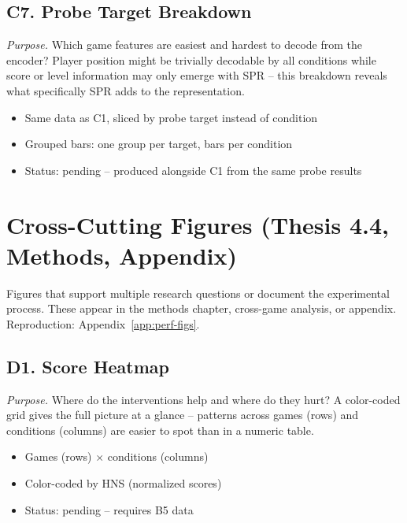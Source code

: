 \documentclass[11pt]{article}
\begin{document}
\vspace{0.5em}

\subsection*{C7. Probe Target Breakdown}

\noindent\textit{Purpose.} Which game features are easiest and
hardest to decode from the encoder? Player position might be
trivially decodable by all conditions while score or level
information may only emerge with SPR -- this breakdown reveals
what specifically SPR adds to the representation.

\begin{itemize}[leftmargin=2em, itemsep=0.1em, topsep=0.3em]
  \item Same data as C1, sliced by probe target instead of
    condition
  \item Grouped bars: one group per target, bars per condition
  \item Status: pending -- produced alongside C1 from the same
    probe results
\end{itemize}


\section{Cross-Cutting Figures (Thesis 4.4, Methods, Appendix)}

\noindent Figures that support multiple research questions or
document the experimental process. These appear in the methods
chapter, cross-game analysis, or appendix.
Reproduction: Appendix~\ref{app:perf-figs}.

\subsection*{D1. Score Heatmap}

\noindent\textit{Purpose.} Where do the interventions help and
where do they hurt? A color-coded grid gives the full picture at
a glance -- patterns across games (rows) and conditions (columns)
are easier to spot than in a numeric table.

\begin{itemize}[leftmargin=2em, itemsep=0.1em, topsep=0.3em]
  \item Games (rows) $\times$ conditions (columns)
  \item Color-coded by HNS (normalized scores)
  \item Status: pending -- requires B5 data
\end{itemize}
\end{document}
